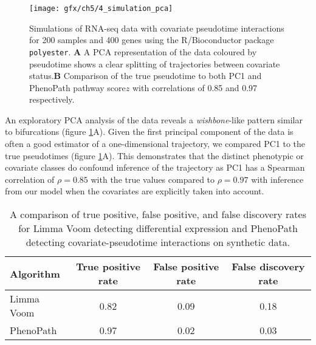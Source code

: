 \begin{figure}
\centering
  \texttt{[image: gfx/ch5/4\_simulation\_pca]}
  \caption{Simulations of RNA-seq data with covariate pseudotime interactions for 200 samples and 400 genes using the R/Bioconductor package \texttt{polyester}. \textbf{A} A PCA representation of the data coloured by pseudotime shows a clear splitting of trajectories between covariate status.\textbf{B} Comparison of the true pseudotime to both PC1 and PhenoPath pathway score$z$ with correlations of 0.85 and 0.97 respectively.
  } \label{fig:simulation_pca}
\end{figure}


An exploratory PCA analysis of the data reveals a \emph{wishbone}-like pattern similar to bifurcations (figure \ref{fig:simulation_pca}A). Given the first principal component of the data is often a good estimator of a one-dimensional trajectory, we compared PC1 to the true pseudotimes (figure \ref{fig:simulation_pca}A). This demonstrates that the distinct phenotypic or covariate classes do confound inference of the trajectory as PC1 has a Spearman correlation of $\rho = 0.85$ with the true values compared to $\rho = 0.97$ with inference from our model when the covariates are explicitly taken into account.


\begin{table}[!t]
\begin{center}
    \begin{tabular}{ | l | c  c  c |}
    \hline
    Algorithm & True positive rate & False positive rate & False discovery rate \\ \hline
    Limma Voom & 0.82 & 0.09 & 0.18 \\
    PhenoPath & 0.97 & 0.02 & 0.03 \\
    \hline
  \end{tabular}
\end{center} \caption{A comparison of true positive, false positive, and false discovery rates for Limma Voom detecting differential expression and PhenoPath detecting covariate-pseudotime interactions on synthetic data.} \label{tbl:fdr}
\end{table}

